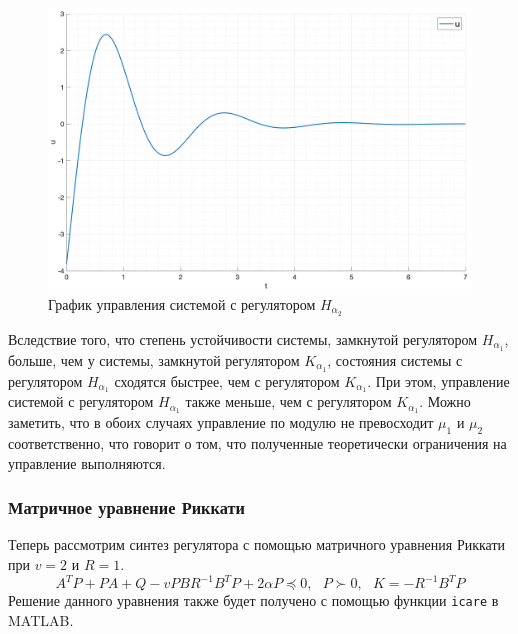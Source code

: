 \begin{figure}[ht!]
    \centering
    \includegraphics[width=\textwidth]{media/plots/task1_4_u.png}
    \caption{График управления системой с регулятором $H_{\alpha_2}$}
    \label{fig:task1_4_u}
\end{figure}

\FloatBarrier   

Вследствие того, что степень устойчивости системы, замкнутой регулятором $H_{\alpha_1}$, 
больше, чем у системы, замкнутой регулятором $K_{\alpha_1}$, состояния системы с регулятором $H_{\alpha_1}$
сходятся быстрее, чем с регулятором $K_{\alpha_1}$.
При этом, управление системой с регулятором $H_{\alpha_1}$ также меньше, чем с регулятором $K_{\alpha_1}$. 
Можно заметить, что в обоих случаях управление по модулю не превосходит $\mu_1$ и $\mu_2$ соответственно, 
что говорит о том, что полученные теоретически ограничения на управление выполняются.

\FloatBarrier
\subsubsection{Матричное уравнение Риккати}
Теперь рассмотрим синтез регулятора с помощью матричного уравнения Риккати при 
$v = 2$ и $R = 1$.
\begin{equation}
    A^TP + PA + Q - vPBR^{-1}B^TP + 2\alpha P \preceq 0, ~~~ P \succ 0, ~~~ K = -R^{-1}B^TP 
\end{equation}
Решение данного уравнения также будет получено с помощью функции \texttt{icare} в MATLAB.

